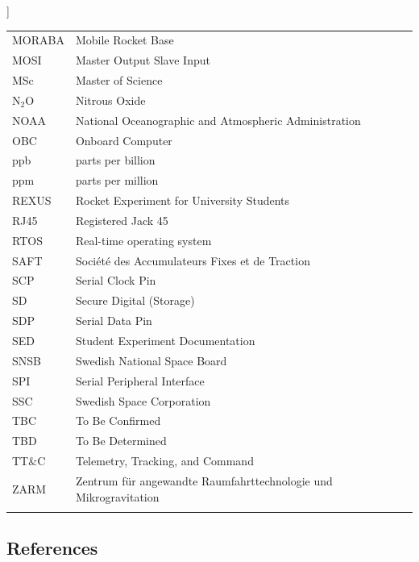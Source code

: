 ]\documentclass[a4paper,12pt,twoside]{article}
\begin{document}
\begin{longtable}{p{3cm} p{9cm}}
            MORABA      & Mobile Rocket Base \\
            MOSI        & Master Output Slave Input\\
            MSc         & Master of Science \\
            N$_{2}$O    & Nitrous Oxide \\
            NOAA        & National Oceanographic and Atmospheric Administration \\
            OBC         & Onboard Computer\\
            ppb         & parts per billion\\
            ppm         & parts per million\\
            REXUS       & Rocket Experiment for University Students \\
            RJ45        & Registered Jack 45 \\
            RTOS        & Real-time operating system\\
            SAFT        & Soci\'{e}t\'{e} des Accumulateurs Fixes et de Traction\\
            SCP         & Serial Clock Pin\\
            SD          & Secure Digital (Storage) \\
            SDP         & Serial Data Pin\\
            SED         & Student Experiment Documentation \\
            SNSB        & Swedish National Space Board \\
            SPI         & Serial Peripheral Interface\\
            SSC         & Swedish Space Corporation \\
            TBC         & To Be Confirmed\\
            TBD         & To Be Determined \\
            TT$\&$C     & Telemetry, Tracking, and Command\\
            ZARM        & Zentrum f{\"u}r angewandte Raumfahrttechnologie und Mikrogravitation \\            
        \label{tab:abbrevi}
    \end{longtable}
    \raggedbottom
\pagebreak
\subsection{References}
\end{document}
